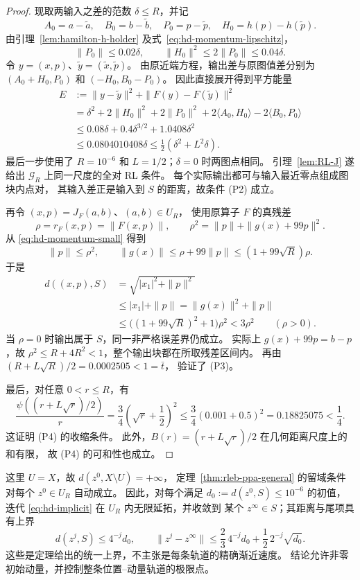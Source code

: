 \begin{proof}
现取两输入之差的范数 $\delta\le R$，并记
\[
 A_0=a-\widetilde a,\quad B_0=b-\widetilde b,\quad
 P_0=p-\widetilde p,\quad H_0=h(p)-h(\widetilde p).
\]
由引理~\ref{lem:hamilton-h-holder} 及式~\eqref{eq:hd-momentum-lipschitz}，
\[
 \|P_0\|\le0.02\delta,\qquad
 \|H_0\|^2\le2\|P_0\|\le0.04\delta.
\]
令 $y=(x,p)$、$\widetilde y=(\widetilde x,\widetilde p)$。
由原近端方程，输出差与原图值差分别为
$(A_0+H_0,P_0)$ 和 $(-H_0,B_0-P_0)$。
因此直接展开得到平方能量
\[
 \begin{aligned}
 E&:=\|y-\widetilde y\|^2+\|F(y)-F(\widetilde y)\|^2\\
 &=\delta^2+2\|H_0\|^2+2\|P_0\|^2
       +2\langle A_0,H_0\rangle-2\langle B_0,P_0\rangle\\
 &\le0.08\delta+0.4\delta^{3/2}+1.0408\delta^2\\
 &\le0.0804010408\delta
 \le\frac12(\delta^2+L^2\delta).
 \end{aligned}
\]
最后一步使用了 $R=10^{-6}$ 和 $L=1/2$；$\delta=0$ 时两图点相同。
引理~\ref{lem:RL-J} 遂给出 $\mathcal G_R$ 上同一尺度的全对 RL 条件。
每个实际输出都可与输入最近零点组成图块内点对，
其输入差正是输入到 $S$ 的距离，故条件 (P2) 成立。

再令 $(x,p)=J_F(a,b)$、$(a,b)\in U_R$，
使用原算子 $F$ 的真残差
\[
 \rho=r_F(x,p)=\|F(x,p)\|,\qquad
 \rho^2=\|p\|+\|g(x)+99p\|^2.
\]
从 \eqref{eq:hd-momentum-small} 得到
\[
 \|p\|\leq\rho^2,\qquad
 \|g(x)\|\leq\rho+99\|p\|
             \leq(1+99\sqrt R)\rho.
\]
于是
\[
 \begin{split}
 d((x,p),S)&=\sqrt{|x_1|^2+\|p\|^2}\\
 &\leq |x_1|+\|p\|
  =\|g(x)\|^2+\|p\|\\
 &\leq\bigl((1+99\sqrt R)^2+1\bigr)\rho^2
  <3\rho^2\qquad(\rho>0).
 \end{split}
\]
当 $\rho=0$ 时输出属于 $S$，同一非严格误差界仍成立。
实际上 $g(x)+99p=b-p$，故
$\rho^2\leq R+4R^2<1$，整个输出块都在所取残差区间内。
再由 $(R+L\sqrt R)/2=0.0002505<1=\bar t$，
验证了 (P3)。

最后，对任意 $0<r\leq R$，有
\[
 \frac{\psi((r+L\sqrt r)/2)}r
 =\frac34\left(\sqrt r+\frac12\right)^2
 \leq\frac34(0.001+0.5)^2
 =0.18825075<\frac14.
\]
这证明 (P4) 的收缩条件。
此外，$B(r)=(r+L\sqrt r)/2$ 在几何距离尺度上的和有限，
故 (P4) 的可和性也成立。
\end{proof}

这里 $U=X$，故 $d(z^0,X\setminus U)=+\infty$，
定理~\ref{thm:rleb-ppa-general} 的留域条件对每个 $z^0\in U_R$ 自动成立。
因此，对每个满足 $d_0:=d(z^0,S)\leq10^{-6}$ 的初值，
迭代 \eqref{eq:hd-implicit} 在 $U_R$ 内无限延拓，并收敛到
某个 $z^\infty\in S$；其距离与尾项具有上界
\[
 d(z^j,S)\leq4^{-j}d_0,\qquad
 \|z^j-z^\infty\|
 \leq\frac23\,4^{-j}d_0+\frac12\,2^{-j}\sqrt{d_0}.
\]
这些是定理给出的统一上界，不主张是每条轨道的精确渐近速度。
结论允许非零初始动量，并控制整条位置--动量轨道的极限点。

